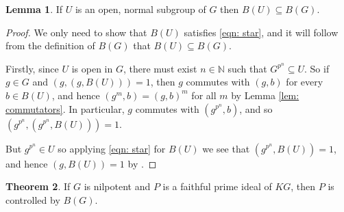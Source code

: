 \documentclass[12pt,a4paper]{article}
\theoremstyle{definition}
\newtheorem{thm}{Theorem}[section]
\newtheorem{lem}[thm]{Lemma}
\theoremstyle{remark}
\theoremstyle{custthm}
\begin{document}
\begin{lem}\label{lem: B of open subgroup}
If $U$ is an open, normal subgroup of $G$ then $B(U)\subseteq B(G)$.
\end{lem}

\begin{proof}

We only need to show that $B(U)$ satisfies \eqref{eqn: star}, and it will follow from the definition of $B(G)$ that $B(U)\subseteq B(G)$. 

Firstly, since $U$ is open in $G$, there must exist $n\in\mathbb{N}$ such that $G^{p^n}\subseteq U$. So if $g\in G$ and $(g,(g,B(U)))=1$, then $g$ commutes with $(g,b)$ for every $b\in B(U)$, and hence $(g^m,b) = (g,b)^m$ for all $m$ by Lemma \ref{lem: commutators}. In particular, $g$ commutes with $(g^{p^n},b)$, and so $(g^{p^n},(g^{p^n},B(U))) = 1$.

But $g^{p^n}\in U$ so applying \eqref{eqn: star} for $B(U)$ we see that $(g^{p^n},B(U))=1$, and hence $(g,B(U))=1$ by \cite[Ch. III, 2.1.4]{Laz65}.\end{proof}

\begin{thm}\label{thm: faithful primes are controlled by B}
If $G$ is nilpotent and $P$ is a faithful prime ideal of $KG$, then $P$ is controlled by $B(G)$.
\end{thm}
\end{document}
